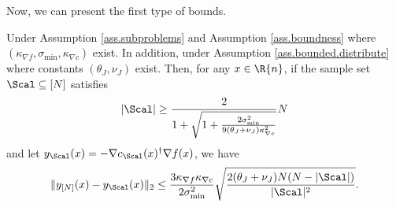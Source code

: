 Now, we can present the first type of bounds.
\begin{lemma}
\label{lemma.bound.y.y_p}
Under Assumption \ref{ass.subproblems} and Assumption \ref{ass.boundness} where $(\kappa_{\nabla f}, \sigma_{\min},\kappa_{\nabla c})$ exist. In addition, under Assumption \ref{ass.bounded.distribute} where constants $(\theta_J,\nu_J)$ exist. Then, for any $x\in\R{n}$, if the sample set $\Scal\subseteq[N]$ satisfies 
\[
|\Scal|\ge\frac{2}{1+\sqrt{1+\frac{2\sigma_{\min}^2}{9(\theta_J+\nu_J)\kappa_{\nabla c}^2}}}N 
\]
and let $y_\Scal(x)=-\nabla c_\Scal(x)^\dag\nabla f(x)$, we have
 	\[
 	\|y_{[N]}(x)-y_\Scal(x)\|_2\le \frac{3\kappa_{\nabla f}\kappa_{\nabla c}}{2\sigma_{\min}^2}\sqrt{ \frac{2(\theta_J+\nu_J)N(N-|\Scal|)}{|\Scal|^2}}.
 	\]
 \end{lemma}
 
